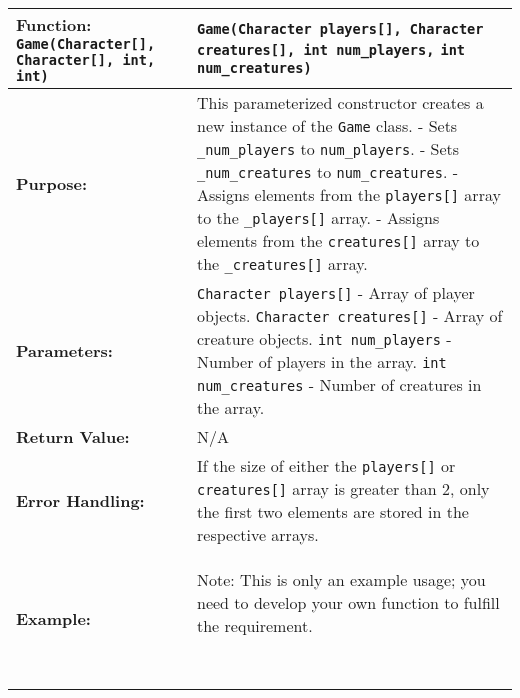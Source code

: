 \renewcommand{\arraystretch}{1.5}
\begin{longtable}{|p{1.7in}|p{4.3in}|}
\hline
\textbf{Function:} \texttt{Game(Character[],} \newline \texttt{Character[], int, int)} & \texttt{Game(Character players[], Character creatures[], int num_players,} \texttt{int num_creatures)} \\ \hline

\textbf{Purpose:} & This parameterized constructor creates a new instance of the \texttt{Game} class. \newline
- Sets \texttt{_num_players} to \texttt{num_players}. \newline
- Sets \texttt{_num_creatures} to \texttt{num_creatures}. \newline
- Assigns elements from the \texttt{players[]} array to the \texttt{_players[]} array. \newline
- Assigns elements from the \texttt{creatures[]} array to the \texttt{_creatures[]} array. \\ \hline

\textbf{Parameters:} & 
\texttt{Character players[]} - Array of player objects. \newline
\texttt{Character creatures[]} - Array of creature objects. \newline
\texttt{int num_players} - Number of players in the array. \newline
\texttt{int num_creatures} - Number of creatures in the array. \\ \hline

\textbf{Return Value:} & N/A \\ \hline

\textbf{Error Handling:} & 
If the size of either the \texttt{players[]} or \texttt{creatures[]} array is greater than 2, only the first two elements are stored in the respective arrays. \\ \hline

\textbf{Example:} & 

\begin{example}

Note: This is only an example usage; you need to develop your own function to fulfill the requirement.

\begin{verbatim}


\end{verbatim}
\end{example}
\end{longtable}
